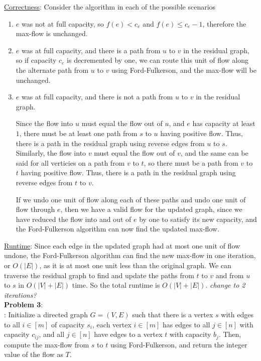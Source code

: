 \documentclass{article}
\begin{document}
\underline{Correctness}: Consider the algorithm in each of the possible scenarios
\begin{enumerate}
    \item $e$ was not at full capacity, so $f(e) < c_e$ and $f(e) \leq c_e - 1$, therefore the max-flow is unchanged.
    \item $e$ was at full capacity, and there is a path from $u$ to $v$ in the residual graph, so if capacity $c_e$ is decremented by one, we can route this unit of flow along the alternate path from $u$ to $v$ using Ford-Fulkerson, and the max-flow will be unchanged.
    \item $e$ was at full capacity, and there is not a path from $u$ to $v$ in the residual graph. 
    
    Since the flow into $u$ must equal the flow out of $u$, and $e$ has capacity at least $1$, there must be at least one path from $s$ to $u$ having positive flow. Thus, there is a path in the residual graph using reverse edges from $u$ to $s$. Similarly, the flow into $v$ must equal the flow out of $v$, and the same can be said for all verticies on a path from $v$ to $t$, so there must be a path from $v$ to $t$ having positive flow. Thus, there is a path in the residual graph using reverse edges from $t$ to $v$. 
    
    If we undo one unit of flow along each of these paths and undo one unit of flow through $e$, then we have a valid flow for the updated graph, since we have reduced the flow into and out of $e$ by one to satisfy its new capacity, and the Ford-Fulkerson algorithm can now find the updated max-flow.
\end{enumerate}
\underline{Runtime}: Since each edge in the updated graph had at most one unit of flow undone, the Ford-Fulkerson algorithm can find the new max-flow in one iteration, or $O(|E|)$, as it is at most one unit less than the original graph. We can traverse the residual graph to find and update the paths from $t$ to $v$ and from $u$ to $s$ in $O(|V| + |E|)$ time. So the total runtime is $O(|V| + |E|)$. \textit{change to 2 iterations?} \\[1.0ex]
\textbf{Problem 3}: \\[0.75ex]
: Initialize a directed graph $G = (V, E)$ such that there is a vertex $s$ with edges to all $i \in [m]$ of capacity $s_i$, each vertex $i \in [m]$ has edges to all $j \in [n]$ with capacity $c_{ij}$, and all $j \in [n]$ have edges to a vertex $t$ with capacity $b_j$. Then, compute the max-flow from $s$ to $t$ using Ford-Fulkerson, and return the integer value of the flow as $T$. \\[0.5ex]
\end{document}
